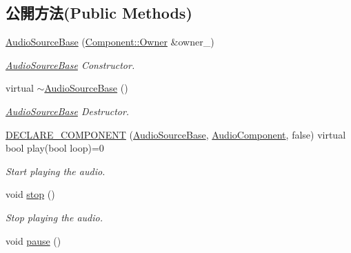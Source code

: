 \subsection*{公開方法(Public Methods)}
\begin{DoxyCompactItemize}
\item 
\hyperlink{class_magnum_1_1_audio_source_base_a8accbc06cfd3fcfc040d43c65ebf5b88}{Audio\+Source\+Base} (\hyperlink{class_magnum_1_1_component_1_1_owner}{Component\+::\+Owner} \&owner\+\_\+)
\begin{DoxyCompactList}\small\item\em \hyperlink{class_magnum_1_1_audio_source_base}{Audio\+Source\+Base} Constructor. \end{DoxyCompactList}\item 
virtual \hyperlink{class_magnum_1_1_audio_source_base_aebd15e698595d7592b9affe4cfbe747a}{$\sim$\+Audio\+Source\+Base} ()
\begin{DoxyCompactList}\small\item\em \hyperlink{class_magnum_1_1_audio_source_base}{Audio\+Source\+Base} Destructor. \end{DoxyCompactList}\item 
\hyperlink{class_magnum_1_1_audio_source_base_a1aed201755910a3f876895ff284796d1}{D\+E\+C\+L\+A\+R\+E\+\_\+\+C\+O\+M\+P\+O\+N\+E\+NT} (\hyperlink{class_magnum_1_1_audio_source_base}{Audio\+Source\+Base}, \hyperlink{class_magnum_1_1_audio_component}{Audio\+Component}, false)   virtual bool play(bool loop)=0
\begin{DoxyCompactList}\small\item\em Start playing the audio. \end{DoxyCompactList}\item 
void \hyperlink{class_magnum_1_1_audio_source_base_a67549138116b6c4d7824fa38c8a856e2}{stop} ()\hypertarget{class_magnum_1_1_audio_source_base_a67549138116b6c4d7824fa38c8a856e2}{}\label{class_magnum_1_1_audio_source_base_a67549138116b6c4d7824fa38c8a856e2}

\begin{DoxyCompactList}\small\item\em Stop playing the audio. \end{DoxyCompactList}\item 
void \hyperlink{class_magnum_1_1_audio_source_base_ade617910f4a1eb964516aa68c705f471}{pause} ()\hypertarget{class_magnum_1_1_audio_source_base_ade617910f4a1eb964516aa68c705f471}{}\label{class_magnum_1_1_audio_source_base_ade617910f4a1eb964516aa68c705f471}


\end{DoxyCompactItemize}
